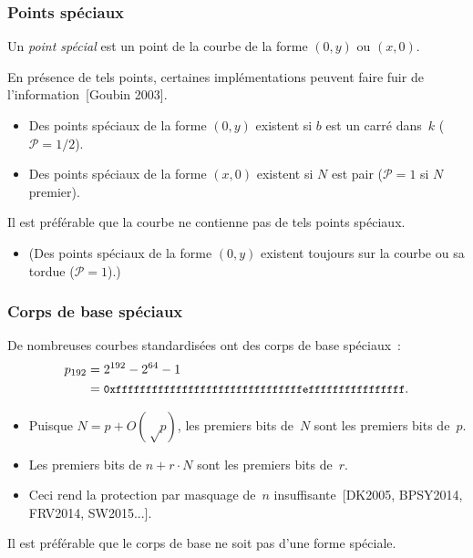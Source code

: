 \documentclass[francais]{beamer}
\newcommand{\prob}{\mathcal{P}}
\newcommand{\bib}[1]{{\usebeamercolor{emph}\textcolor{fg}{~[#1]}}}
\begin{document}
\begin{frame}\frametitle{Points spéciaux}
Un \emph{point spécial} est un point de la courbe
de la forme $(0, y)$ ou $(x, 0)$.

En présence de tels points, certaines implémentations
peuvent faire fuir de l'information\bib{Goubin 2003}.

\begin{itemize}
\item Des points spéciaux de la forme $(0, y)$ existent
si $b$ est un carré dans~$k$ ($\prob = 1/2$).
\item Des points spéciaux de la forme $(x, 0)$ existent
si $N$ est pair ($\prob = 1$ si $N$ premier).
\end{itemize}

\begin{block}{}
Il est préférable que la courbe ne contienne pas de tels points spéciaux.
\end{block}
\begin{itemize}
\item (Des points spéciaux de la forme $(0, y)$ existent toujours sur la courbe
ou sa tordue ($\prob = 1$).)
\end{itemize}
\end{frame}

\begin{frame}\frametitle{Corps de base spéciaux}
De nombreuses courbes standardisées ont des corps de base spéciaux :
\[\begin{split} p_{192} &= 2^{192} - 2^{64} - 1\\
&= \texttt{\small 0xfffffffffffffffffffffffffffffffeffffffffffffffff}.
\end{split}\]
\begin{itemize}
\item Puisque $N = p + O(√p)$,
les premiers bits de~$N$ sont les premiers bits de~$p$.
\item Les premiers bits de $n + r · N$
sont les premiers bits de~$r$.
\item Ceci rend la protection par masquage de~$n$
insuffisante\bib{DK2005, BPSY2014, FRV2014, SW2015...}.
\end{itemize}

\begin{block}{}
Il est préférable que le corps de base ne soit pas d'une forme
spéciale.
\end{block}
\end{frame}
\end{document}
